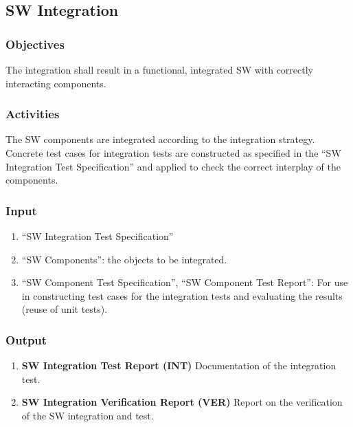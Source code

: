 \documentclass{template/openetcs_article}
\begin{document}
\subsection{SW Integration}
\label{sec:sw-integration-test}


\subsubsection{Objectives}
\label{sec:6-objectives}

The integration shall result in a functional, integrated SW with
correctly interacting components.  

\subsubsection{Activities}
\label{sec:6-activities}

The SW components are integrated according to the integration
strategy. Concrete test cases for integration tests are constructed as
specified in the ``SW Integration Test Specification'' and applied to
check the correct interplay of the components.

\subsubsection{Input}
\label{sec:6-input}

\begin{enumerate}
\item ``SW  Integration Test Specification''
\item ``SW Components'': the objects to be integrated.
\item ``SW Component Test Specification'', ``SW Component Test
  Report'': For use in constructing test cases for the integration tests
  and evaluating the results (reuse  of unit tests).
\end{enumerate}

\subsubsection{Output}
\label{sec:6-output}

\begin{enumerate}
\item \textbf{SW Integration Test Report (INT)} Documentation of the
  integration test.
\item \textbf{SW Integration Verification Report (VER)} Report on the
  verification of the SW integration and test.
\end{enumerate}
\end{document}
